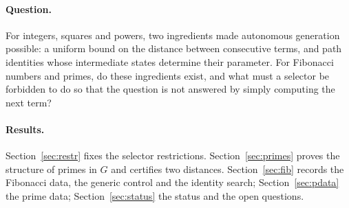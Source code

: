 \documentclass[11pt]{article}
\theoremstyle{definition}
\begin{document}
\paragraph{Question.} For integers, squares and powers, two ingredients made autonomous generation possible: a uniform bound on the distance between consecutive terms, and path identities whose intermediate states determine their parameter. For Fibonacci numbers and primes, do these ingredients exist, and what must a selector be forbidden to do so that the question is not answered by simply computing the next term?

\paragraph{Results.} Section~\ref{sec:restr} fixes the selector restrictions. Section~\ref{sec:primes} proves the structure of primes in $G$ and certifies two distances. Section~\ref{sec:fib} records the Fibonacci data, the generic control and the identity search; Section~\ref{sec:pdata} the prime data; Section~\ref{sec:status} the status and the open questions.
\end{document}
